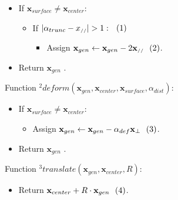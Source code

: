 \documentclass[parskip=full]{scrartcl}
\newcommand{\inlineeqnum}{\refstepcounter{equation}~~\mbox{(\theequation)}}
\begin{document}
\begin{itemize}

	\item[] If \( \textbf{x}_{surface} \neq \textbf{x}_{center} \):

	\begin{itemize}

		\item[] If \( |\alpha_{trunc} - x_{\scriptscriptstyle//}| > 1: \inlineeqnum\label{eqn:condition} \)

		\begin{itemize}

			\item[] Assign \( \textbf{x}_{gen} \leftarrow \textbf{x}_{gen} - 2 \textbf{x}_{\scriptscriptstyle//} \inlineeqnum\label{eqn:truncate} \).
			
		\end{itemize}

	\end{itemize}
	
	\item[] Return \( \textbf{x}_{gen} \) .
	
\end{itemize}

Function \( ^{2} \)\( deform(\textbf{x}_{gen}, \textbf{x}_{center}, \textbf{x}_{surface}, \alpha_{dist}) \):

\begin{itemize}

	\item[] If \( \textbf{x}_{surface} \neq \textbf{x}_{center}\):
		
	\begin{itemize}	
		
		\item[] Assign \( \textbf{x}_{gen} \leftarrow \textbf{x}_{gen} - \alpha_{def} \textbf{x}_{\bot} \inlineeqnum\label{eqn:deform} \).
		
	\end{itemize}

	\item[] Return \( \textbf{x}_{gen} \) . 
	
\end{itemize}

Function \( ^{3} \)\( translate(\textbf{x}_{gen}, \textbf{x}_{center}, R) \):

\begin{itemize}

\item[] Return \( \textbf{x}_{center} +  R \cdot \textbf{x}_{gen} \inlineeqnum\label{eqn:translate} \).

\end{itemize}
\end{document}

